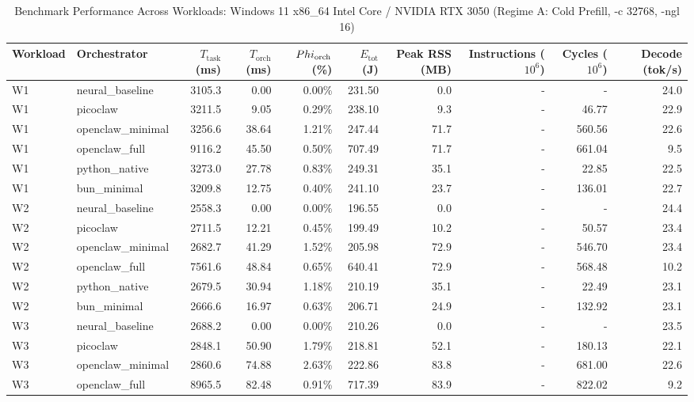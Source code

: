 \begin{table}[t]
\centering\small
\caption{Benchmark Performance Across Workloads: Windows 11 x86_64 Intel Core / NVIDIA RTX 3050 (Regime A: Cold Prefill, -c 32768, -ngl 16)}
\label{tab:Windows_master_summary}
\begin{tabular}{llrrrrrrrr}
\toprule
Workload & Orchestrator & $T_{\text{task}}$ (ms) & $T_{\text{orch}}$ (ms) & $\\Phi_{\text{orch}}$ (\%) & $E_{\text{tot}}$ (J) & Peak RSS (MB) & Instructions ($10^6$) & Cycles ($10^6$) & Decode (tok/s) \\
\midrule
W1 & neural\_baseline & 3105.3 & 0.00 & 0.00\% & 231.50 & 0.0 & - & - & 24.0 \\
W1 & picoclaw & 3211.5 & 9.05 & 0.29\% & 238.10 & 9.3 & - & 46.77 & 22.9 \\
W1 & openclaw\_minimal & 3256.6 & 38.64 & 1.21\% & 247.44 & 71.7 & - & 560.56 & 22.6 \\
W1 & openclaw\_full & 9116.2 & 45.50 & 0.50\% & 707.49 & 71.7 & - & 661.04 & 9.5 \\
W1 & python\_native & 3273.0 & 27.78 & 0.83\% & 249.31 & 35.1 & - & 22.85 & 22.5 \\
W1 & bun\_minimal & 3209.8 & 12.75 & 0.40\% & 241.10 & 23.7 & - & 136.01 & 22.7 \\
\midrule
W2 & neural\_baseline & 2558.3 & 0.00 & 0.00\% & 196.55 & 0.0 & - & - & 24.4 \\
W2 & picoclaw & 2711.5 & 12.21 & 0.45\% & 199.49 & 10.2 & - & 50.57 & 23.4 \\
W2 & openclaw\_minimal & 2682.7 & 41.29 & 1.52\% & 205.98 & 72.9 & - & 546.70 & 23.4 \\
W2 & openclaw\_full & 7561.6 & 48.84 & 0.65\% & 640.41 & 72.9 & - & 568.48 & 10.2 \\
W2 & python\_native & 2679.5 & 30.94 & 1.18\% & 210.19 & 35.1 & - & 22.49 & 23.1 \\
W2 & bun\_minimal & 2666.6 & 16.97 & 0.63\% & 206.71 & 24.9 & - & 132.92 & 23.1 \\
\midrule
W3 & neural\_baseline & 2688.2 & 0.00 & 0.00\% & 210.26 & 0.0 & - & - & 23.5 \\
W3 & picoclaw & 2848.1 & 50.90 & 1.79\% & 218.81 & 52.1 & - & 180.13 & 22.1 \\
W3 & openclaw\_minimal & 2860.6 & 74.88 & 2.63\% & 222.86 & 83.8 & - & 681.00 & 22.6 \\
W3 & openclaw\_full & 8965.5 & 82.48 & 0.91\% & 717.39 & 83.9 & - & 822.02 & 9.2 \\

\end{tabular}
\end{table}
